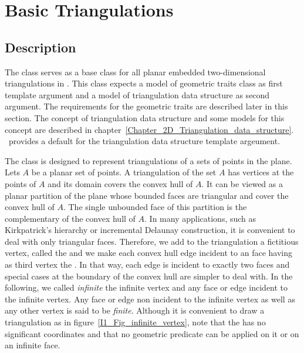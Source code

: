 \section{Basic Triangulations}
\label{Section_2D_Triangulations_Basic}

\subsection{Description}
\label{Subsection_2D_Triangulations_Basic_Description}

The class 
serves as a base class for all
planar embedded two-dimensional triangulations
in \cgal.
This class expects a model of  {geometric traits} class
as first template argument and a model of {triangulation data structure}
as second argument. The requirements  for the geometric traits
are described later in this section. 
The concept of 
{triangulation data structure} and some models for this concept are
described in chapter~\ref{Chapter_2D_Triangulation_data_structure}.
\cgal\ provides a default for the triangulation data structure
template argeument.
 
The class 
is designed to represent triangulations
 of a sets of points in the plane.
Lets ${  A}$ be a planar set of points.  
A triangulation of the set ${  A}$ has vertices at the points of ${  A}$
and its domain covers the convex hull of ${  A}$.
It can be viewed as a planar partition of the plane
whose bounded faces are triangular and cover
the convex hull of ${  A}$. The single unbounded face of this partition
is the complementary of the convex hull of ${  A}$. 
In many applications, such as Kirkpatrick's hierarchy
or incremental Delaunay construction, it is convenient to
deal with only triangular faces. Therefore, we add to the
triangulation
a fictitious vertex, called the 
and we make each  convex hull edge incident 
to an  
face having as third vertex  the .
 In that way, each edge is incident to exactly two faces
and special cases at the
boundary of the convex hull are simpler to deal with.
In the following, we called {\it infinite}  the infinite vertex
and any face or edge 
incident  to the infinite vertex. Any face or edge non incident
to the infinite vertex as well as any other vertex
  is said 
to be {\it finite}.
Although it is convenient to draw a triangulation as in
figure~\ref{I1_Fig_infinite_vertex}, note that
the  has no significant
coordinates and that no geometric predicate can be applied on it
or on an infinite face.

